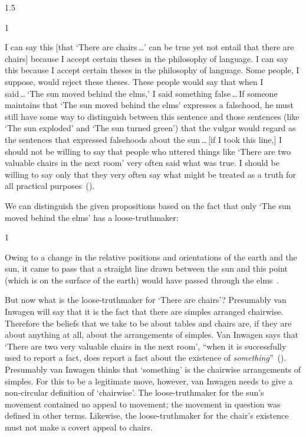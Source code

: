 \documentclass[11pt]{standalone}
\newenvironment{squote}{%
\begin{spacing}{1}
       	\begin{list}{}{%
\setlength{\labelwidth}{0pt}%
\rightmargin\leftmargin%
}
\item\relax
}{%
\end{list}%
\end{spacing}
}
\begin{document}
\begin{spacing}{1.5}
\begin{squote}
I can say this [that `There are chairs\,\ldots ' can be true yet not
  entail that there are chairs] because I accept certain theses in the
philosophy of language.  I can say this because I accept certain
theses in the philosophy of language.  Some people, I suppose, would
reject these theses.  These people would say that when I
said\,\ldots\,`The sun moved behind the elms,' I said something
false\,\ldots\,If someone maintains that `The sun moved behind the
elms' expresses a falsehood, he must still have some way to
distinguish between this sentence and those sentences (like `The sun
exploded' and `The sun turned green') that the vulgar would regard as
the sentences that expressed falsehoods about the sun\,\ldots\,[if I
  took this line,] I should not be willing to say that people who
uttered things like `There are two valuable chairs in the next room'
very often said what was true.  I should be willing to say only that
they very often say what might be treated as a truth for all practical
purposes~(\citeyear[102--103]{inwagen1995}).
\end{squote}
We can distinguish the given propositions based on the fact that only
`The sun moved behind the elms' has a loose-truthmaker:
\begin{squote}
Owing to a change in the relative positions and orientations of the
earth and the sun, it came to pass that a straight line drawn between
the sun and this point (which is on the surface of the earth) would
have passed through the elms~\citep[112--113]{inwagen1995}.
\end{squote}

But now what is the loose-truthmaker for `There are chairs'?
Presumably van Inwagen will say that it is the fact that there are
simples arranged chairwise.  Therefore the beliefs that we take to be
about tables and chairs are, if they are about anything at all, about
the arrangements of simples.  Van Inwagen says that `There are two
very valuable chairs in the next room', ``when it is successfully used
to report a fact, does report a fact about the existence of {\em
  something}''~(\citeyear[102]{inwagen1995}).  Presumably van Inwagen
thinks that `something' is the chairwise arrangements of simples.  For
this to be a legitimate move, however, van Inwagen needs to give a
non-circular definition of `chairwise'.  The loose-truthmaker for the
sun's movement contained no appeal to movement; the movement in
question was defined in other terms.  Likewise, the loose-truthmaker
for the chair's existence must not make a covert appeal to chairs.


\end{spacing}
\end{document}
